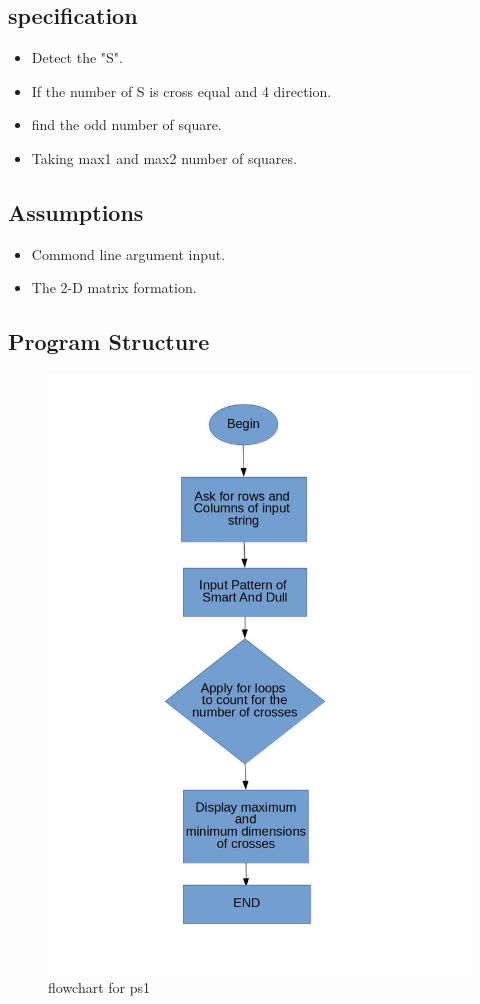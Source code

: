 \documentclass[a4paper,12pt]{article}
\begin{document}
\subsection{specification}
\begin{itemize}
	\item Detect the "S".
	\item If the number of S is cross equal and 4 direction. 
	\item find the odd number of square.
	\item Taking max1 and max2 number of squares.
	\
\end{itemize}
\subsection{Assumptions}
\begin{itemize}
\item Commond line argument input.
\item The 2-D matrix formation.
\end{itemize}

\newpage

\subsection{Program Structure}
\begin{figure}[h]
\includegraphics[scale=0.5]{ps1flow.jpg}
\caption{flowchart for ps1}
\label{fig:flow}
\end{figure}
\end{document}
